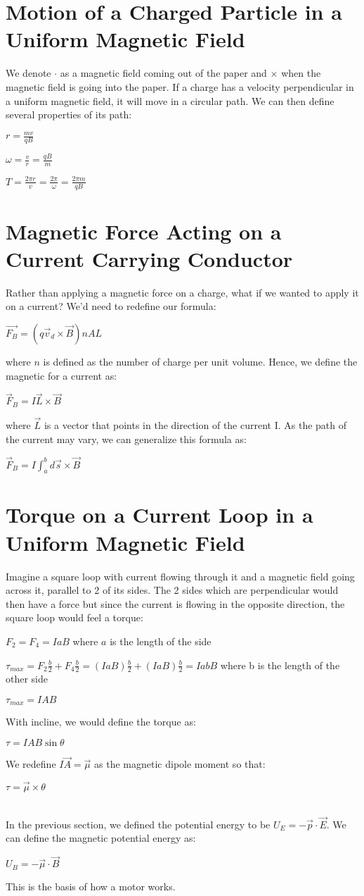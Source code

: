 \documentclass{report}
\begin{document}
	\section{Motion of a Charged Particle in a Uniform Magnetic Field}
		We denote $\cdot$ as a magnetic field coming out of the paper and $\times$ when the magnetic field is going into the paper. If a charge has a velocity perpendicular in a uniform magnetic field, it will move in a circular path. We can then define several properties of its path:\\
		\centerline{$ r = \frac{mv}{qB}$}
		\centerline{$ \omega = \frac{v}{r} = \frac{qB}{m}$}
		\centerline{$ T = \frac{2\pi r}{v} = \frac{2\pi}{\omega} = \frac{2\pi m}{qB}$}
	\section{Magnetic Force Acting on a Current Carrying Conductor}
		Rather than applying a magnetic force on a charge, what if we wanted to apply it on a current? We'd need to redefine our formula:\\
		\centerline{$\vec{F_B} = (q\vec{v}_d \times \vec{B})nAL$}
		where $n$ is defined as the number of charge per unit volume. Hence, we define the magnetic for a current as:\\
		\centerline{$\vec{F}_B = I\vec{L} \times \vec{B}$}
		where $\vec{L}$ is a vector that points in the direction of the current I. As the path of the current may vary, we can generalize this formula as:\\
		\centerline{$\vec{F}_B = I\int_{a}^{b} d\vec{s} \times \vec{B}$}
	\section{Torque on a Current Loop in a Uniform Magnetic Field}
		Imagine a square loop with current flowing through it and a magnetic field going across it, parallel to 2 of its sides. The 2 sides which are perpendicular would then have a force but since the current is flowing in the opposite direction, the square loop would feel a torque:\\
		\centerline{$F_2 = F_4 = IaB$ where $a$ is the length of the side}
		\centerline{$\tau_{max} = F_2 \frac{b}{2} + F_4 \frac{b}{2} = (IaB) \frac{b}{2} + (IaB)\frac{b}{2} = IabB$ where b is the length of the other side}
		\centerline{$\tau_{max} = IAB$}
		With incline, we would define the torque as:\\
		\centerline{$\tau = IAB\sin \theta$}
		We redefine $I\vec{A} = \vec{\mu}$ as the magnetic dipole moment so that:\\
		\centerline{$\tau = \vec{\mu} \times \theta$}
		\\
		In the previous section, we defined the potential energy to be $U_E = -\vec{p} \cdot \vec{E}$. We can define the magnetic potential energy as:\\
		\centerline{$U_B = -\vec{\mu} \cdot \vec{B}$}
		This is the basis of how a motor works.
\end{document}
